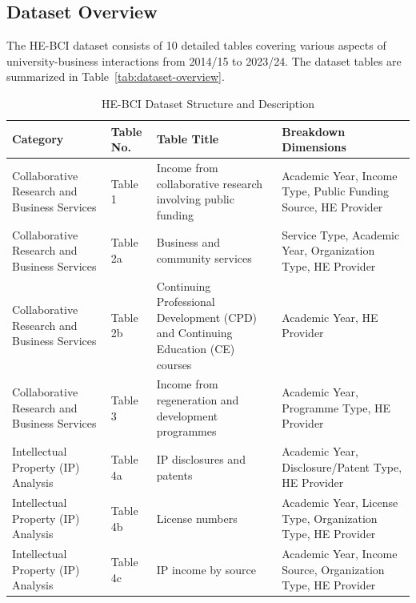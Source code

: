 \documentclass[journal,onecolumn, 10pt,draftclsnofoot]{IEEEtran}
\begin{document}
\subsection{Dataset Overview}
The HE-BCI dataset \cite{hesa_he_bci_2024} consists of 10 detailed tables covering various aspects of university-business interactions from 2014/15 to 2023/24. The dataset tables are summarized in Table~\ref{tab:dataset-overview}.

\vspace{0.3cm}
\begin{table}[h]
\centering
\caption{HE-BCI Dataset Structure and Description}
\vspace{0.1cm}
\renewcommand{\arraystretch}{1.15}
\small
\begin{tabularx}{\textwidth}{|>{\raggedright\arraybackslash}p{3cm}
                                |>{\centering\arraybackslash}p{2cm}
                                |>{\raggedright\arraybackslash}p{5.2cm}
                                |>{\raggedright\arraybackslash}X|}
    \hline
    \textbf{Category} & \textbf{Table No.} & \textbf{Table Title} & \textbf{Breakdown Dimensions} \\
    \hline
    Collaborative Research and Business Services & Table 1 & Income from collaborative research involving public funding & Academic Year, Income Type, Public Funding Source, HE Provider \\
    \hline
    Collaborative Research and Business Services & Table 2a & Business and community services & Service Type, Academic Year, Organization Type, HE Provider \\
    \hline
    Collaborative Research and Business Services & Table 2b & Continuing Professional Development (CPD) and Continuing Education (CE) courses & Academic Year, HE Provider \\
    \hline
    Collaborative Research and Business Services & Table 3 & Income from regeneration and development programmes & Academic Year, Programme Type, HE Provider \\
    \hline
    Intellectual Property (IP) Analysis & Table 4a & IP disclosures and patents & Academic Year, Disclosure/Patent Type, HE Provider \\
    \hline
    Intellectual Property (IP) Analysis & Table 4b & License numbers & Academic Year, License Type, Organization Type, HE Provider \\
    \hline
    Intellectual Property (IP) Analysis & Table 4c & IP income by source & Academic Year, Income Source, Organization Type, HE Provider \\

\end{tabularx}
\end{table}
\end{document}

